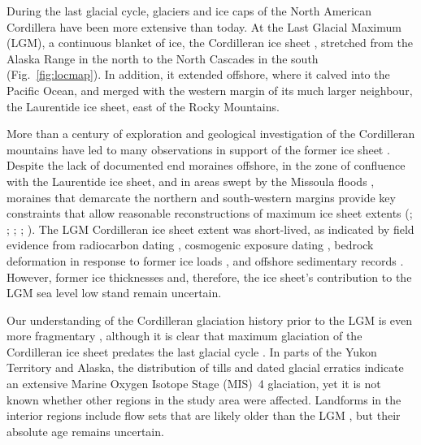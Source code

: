 \documentclass[tc]{copernicus}
\begin{document}
\introduction
\label{sec:intro}

During the last glacial cycle, glaciers and ice caps of the North American
Cordillera have been more extensive than today. At the Last Glacial
Maximum (LGM),
a continuous blanket of ice, the Cordilleran ice sheet
\citep{Dawson.1888}, stretched from the Alaska Range in the north to the
North Cascades in the south (Fig.~\ref{fig:locmap}).
In addition, it extended offshore, where it calved
into the Pacific Ocean, and merged with the western margin of its much larger
neighbour, the Laurentide ice sheet, east of the Rocky Mountains.

More than a century of exploration and geological investigation of the
Cordilleran mountains have led to many observations in support of the former
ice sheet
    \citep{Jackson.Clague.1991}.
Despite the lack of documented end moraines offshore, in the zone of confluence
with the Laurentide ice sheet, and in areas swept by the Missoula floods
    \citep{Carrara.etal.1996},
moraines that demarcate the northern and south-western margins provide key
constraints that allow reasonable reconstructions of maximum ice sheet extents
    (\citealp{Prest.etal.1968}; \citealp[Fig. 1.12]{Clague.1989};
     \citealp{Duk-Rodkin.1999};
     \citealp{Booth.etal.2003}; \citealp{Dyke.2004}).
The LGM Cordilleran ice sheet extent was short-lived, as indicated by
field evidence from radiocarbon dating
    \citep{Clague.etal.1980, Clague.1985, Clague.1986, Porter.Swanson.1998,
           Menounos.etal.2008},
cosmogenic exposure dating
    \citep{Stroeven.etal.2010, Stroeven.etal.2014, Margold.etal.2014},
bedrock deformation in response to former ice loads
    \citep{Clague.James.2002, Clague.etal.2005},
and offshore sedimentary records
    \citep{Cosma.etal.2008, Davies.etal.2011}.
However, former ice thicknesses and, therefore, the ice sheet's contribution to
the LGM sea level low stand
    \citep{Carlson.Clark.2012, Clark.Mix.2002}
remain uncertain.

Our understanding of the Cordilleran glaciation history prior to the LGM is
even more fragmentary
    \citep{Barendregt.Irving.1998, Kleman.etal.2010, Rutter.etal.2012},
although it is clear that maximum glaciation of the Cordilleran ice sheet
predates the last glacial cycle
    \citep{Hidy.etal.2013}.
In parts of the Yukon Territory and Alaska, the distribution of tills
    \citep{Turner.etal.2013}
and dated glacial erratics
    \citep{Ward.etal.2007, Ward.etal.2008, Briner.Kaufman.2008,
           Stroeven.etal.2010, Stroeven.etal.2014}
indicate an extensive Marine Oxygen Isotope Stage (MIS)~4 glaciation,
yet it is not known whether other regions in the study area were affected.
Landforms in the interior regions include flow sets that are likely
older than the LGM
    \citep[Fig.~2]{Kleman.etal.2010},
but their absolute age remains uncertain.
\end{document}
